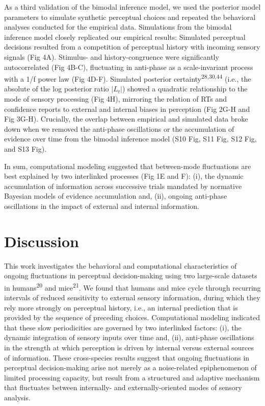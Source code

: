 \documentclass[
]{article}
\begin{document}
As a third validation of the bimodal inference model, we used the
posterior model parameters to simulate synthetic perceptual choices and
repeated the behavioral analyses conducted for the empirical data.
Simulations from the bimodal inference model closely replicated our
empirical results: Simulated perceptual decisions resulted from a
competition of perceptual history with incoming sensory signals (Fig
4A). Stimulus- and history-congruence were significantly autocorrelated
(Fig 4B-C), fluctuating in anti-phase as a scale-invariant process
with a 1/f power law (Fig 4D-F). Simulated posterior
certainty\textsuperscript{28,30,44} (i.e., the absolute of the log
posterior ratio \(|L_t|\)) showed a quadratic relationship to the mode
of sensory processing (Fig 4H), mirroring the relation of RTs and
confidence reports to external and internal biases in perception (Fig
2G-H and Fig 3G-H). Crucially, the overlap between empirical and
simulated data broke down when we removed the anti-phase oscillations or
the accumulation of evidence over time from the bimodal inference model
(S10 Fig, S11 Fig, S12 Fig, and S13 Fig).

In sum, computational modeling suggested that between-mode fluctuations
are best explained by two interlinked processes (Fig 1E and F): (i),
the dynamic accumulation of information across successive trials
mandated by normative Bayesian models of evidence accumulation and,
(ii), ongoing anti-phase oscillations in the impact of external and
internal information.

\hypertarget{discussion}{%
\section{Discussion}\label{discussion}}

This work investigates the behavioral and computational characteristics
of ongoing fluctuations in perceptual decision-making using two
large-scale datasets in humans\textsuperscript{20} and
mice\textsuperscript{21}. We found that humans and mice cycle through
recurring intervals of reduced sensitivity to external sensory
information, during which they rely more strongly on perceptual history,
i.e., an internal prediction that is provided by the sequence of
preceding choices. Computational modeling indicated that these slow
periodicities are governed by two interlinked factors: (i), the dynamic
integration of sensory inputs over time and, (ii), anti-phase
oscillations in the strength at which perception is driven by internal
versus external sources of information. These cross-species results
suggest that ongoing fluctuations in perceptual decision-making arise
not merely as a noise-related epiphenomenon of limited processing
capacity, but result from a structured and adaptive mechanism that
fluctuates between internally- and externally-oriented modes of sensory
analysis.
\end{document}
